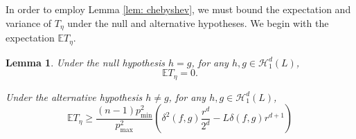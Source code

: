 \documentclass{article}
\newcommand{\1}{\mathbb{I}}
\newcommand{\Ebb}{\mathbb{E}}
\theoremstyle{alden}
\theoremstyle{aldenthm}
\newtheorem{lemma}{Lemma}
\theoremstyle{definition}
\theoremstyle{remark}
\begin{document}
In order to employ Lemma \ref{lem: chebyshev}, we must bound the expectation and variance of $T_{\eta}$ under the null and alternative hypotheses. We begin with the expectation $\Ebb T_{\eta}$. 
\begin{lemma}
	\label{lem: mmd_expectation}
	Under the null hypothesis $h = g$, for any $h, g \in \mathcal{H}_{1}^{d}(L)$,
	\begin{equation*}
	\Ebb T_{\eta} = 0.
	\end{equation*}
	
	Under the alternative hypothesis $h \neq g$, for any $h, g \in \mathcal{H}_{1}^{d}(L)$, 
	\begin{equation*}
	\Ebb T_{\eta} \geq \frac{(n - 1)p_{\min}^2}{ p_{\max}^2} \left(\delta^2(f,g)\frac{r^d}{2^d} - L\delta(f,g)r^{d + 1}\right)
	\end{equation*}
\end{lemma}
\end{document}
